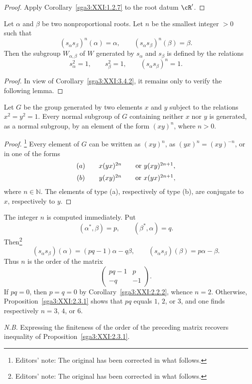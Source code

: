 \begin{proof}
Apply Corollary~\ref{sga3:XXI:1.2.7} to the root datum \(\cR'\).
\end{proof}

\begin{corollary}\label{sga3:XXI:3.4.3}
Let \(\alpha\) and \(\beta\) be two nonproportional roots. Let \(n\)
be the smallest integer \(>0\) such that
\[
 (s_\alpha s_\beta)^n(\alpha)=\alpha,
 \qquad
 (s_\alpha s_\beta)^n(\beta)=\beta.
\]
Then the subgroup \(W_{\alpha,\beta}\) of \(W\) generated by
\(s_\alpha\) and \(s_\beta\) is defined by the relations
\[
 s_\alpha^2=1,\qquad
 s_\beta^2=1,\qquad
 (s_\alpha s_\beta)^n=1.
\]
\end{corollary}

\begin{proof}
In view of Corollary~\ref{sga3:XXI:3.4.2}, it remains only to verify
the following lemma.
\end{proof}

\begin{lemma}\label{sga3:XXI:3.4.4}
Let \(G\) be the group generated by two elements \(x\) and \(y\)
subject to the relations \(x^2=y^2=1\). Every normal subgroup of
\(G\) containing neither \(x\) nor \(y\) is generated, as a normal
subgroup, by an element of the form \((xy)^n\), where \(n>0\).
\end{lemma}

\begin{proof}
\footnote{Editors' note: The original has been corrected in what
follows.}
Every element of \(G\) can be written as \((xy)^n\), as
\((yx)^n=(xy)^{-n}\), or in one of the forms
\[
\begin{array}{c@{\qquad}c@{\qquad}c}
 (a) & x(yx)^{2n} & \text{or } y(xy)^{2n+1},\\[2mm]
 (b) & y(xy)^{2n} & \text{or } x(yx)^{2n+1},
\end{array}
\]
where \(n\in\mathbb{N}\). The elements of type (a), respectively of
type (b), are conjugate to \(x\), respectively to \(y\).
\end{proof}

\begin{remark}\label{sga3:XXI:3.4.5}
The integer \(n\) is computed immediately. Put
\[
 (\alpha^\ast,\beta)=p,\qquad
 (\beta^\ast,\alpha)=q.
\]
Then\footnote{Editors' note: The original has been corrected in what
follows.}
\[
 (s_\alpha s_\beta)(\alpha)=(pq-1)\alpha-q\beta,
 \qquad
 (s_\alpha s_\beta)(\beta)=p\alpha-\beta.
\]
Thus \(n\) is the order of the matrix
\[
 \begin{pmatrix}
  pq-1 & p\\
  -q   & -1
 \end{pmatrix}.
\]
If \(pq=0\), then \(p=q=0\) by
Corollary~\ref{sga3:XXI:2.2.2}, whence \(n=2\). Otherwise,
Proposition~\ref{sga3:XXI:2.3.1} shows that \(pq\) equals \(1\),
\(2\), or \(3\), and one finds respectively \(n=3\), \(4\), or
\(6\).

\smallskip
\noindent
\emph{N.B.} Expressing the finiteness of the order of the preceding
matrix recovers inequality  of
Proposition~\ref{sga3:XXI:2.3.1}.
\end{remark}

